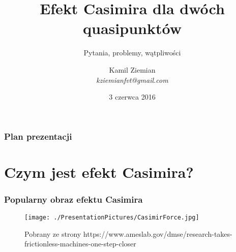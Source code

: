 \documentclass[10pt,t]{beamer}
\title{Efekt Casimira dla dwóch quasipunktów}
\subtitle{Pytania, problemy, wątpliwości}
\author{Kamil Ziemian \\
  \textit{kziemianfvt@gmail.com}}
\date[3 VI 2016]{3 czerwca 2016}
\begin{document}






\RaggedRight





\maketitle %





\begin{frame}
  \frametitle{Plan prezentacji}


  \tableofcontents %

\end{frame}










\section{Czym jest efekt Casimira?}



\begin{frame}
  \frametitle{Popularny obraz efektu Casimira}


  \begin{figure}

    \centering

    \texttt{[image: ./PresentationPictures/CasimirForce.jpg]}


    \caption{Pobrany ze strony
      {https://www.ameslab.gov/dmse/research-takes-frictionless-machines-one-step-closer}}

  \end{figure}

\end{frame}
\end{document}
